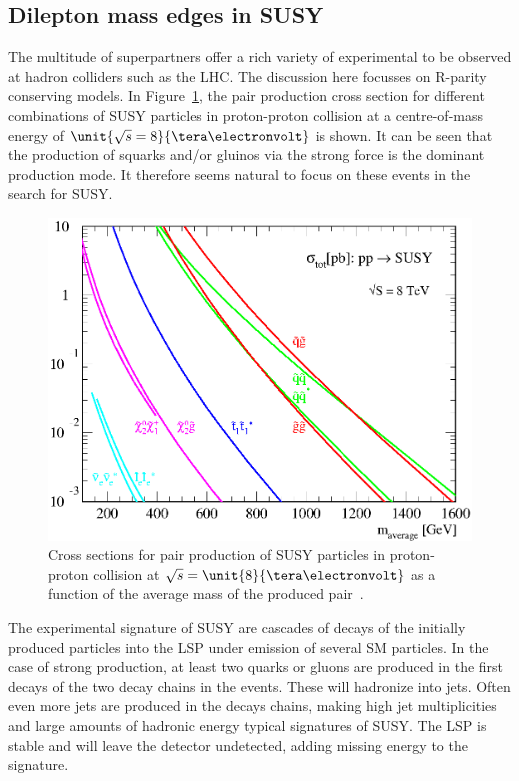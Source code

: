 \subsection{Dilepton mass edges in SUSY}
The multitude of superpartners offer a rich variety of experimental to be observed at hadron colliders such as the LHC. The discussion here focusses on R-parity conserving models. In Figure~\ref{fig:SUSYXSecs}, the pair production cross section for different combinations of SUSY particles in proton-proton collision at a centre-of-mass energy of $\unit{\sqrt{s}=8}{\tera\electronvolt}$ is shown. It can be seen that the production of squarks and/or gluinos via the strong force is the dominant production mode. It therefore seems natural to focus on these events in the search for SUSY.
\begin{figure}
\centering
\includegraphics[scale=0.6]{plots/THEO/prospino_lhc8.eps}
\caption{Cross sections for pair production of SUSY particles in proton-proton collision at $\sqrt{s} = \unit{8}{\tera\electronvolt}$ as a function of the average mass of the produced pair~\cite{ProspinoPlot,Beenakker:1999xh,Beenakker:1997ut,bib-nlo-nll-01}.}
\label{fig:SUSYXSecs}
\end{figure}

The experimental signature of SUSY are cascades of decays of the initially produced particles into the LSP under emission of several SM particles. In the case of strong production, at least two quarks or gluons are produced in the first decays of the two decay chains in the events. These will hadronize into jets. Often even more jets are produced in the decays chains, making high jet multiplicities and large amounts of hadronic energy typical signatures of SUSY. The LSP is stable and will leave the detector undetected, adding missing energy to the signature.


